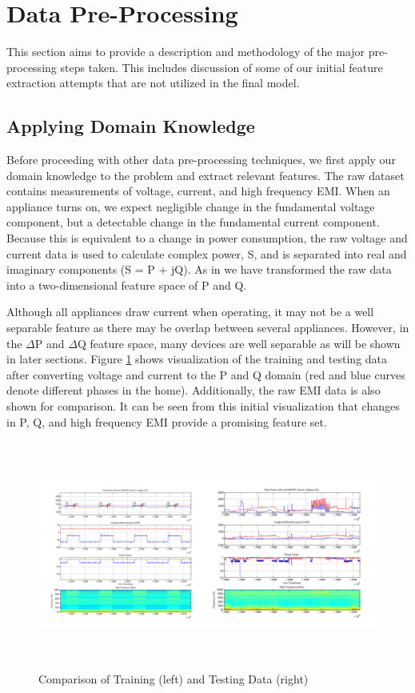\documentclass[11pt, letterpaper]{article}
\begin{document}
\section{Data Pre-Processing}\label{preprocess}

This section aims to provide a description and methodology of the major pre-processing steps taken.  This includes discussion of some of our initial feature extraction attempts that are not utilized in the final model.

\subsection{Applying Domain Knowledge}

Before proceeding with other data pre-processing techniques, we first apply our domain knowledge to the problem and extract relevant features.  The raw dataset contains measurements of voltage, current, and high frequency EMI.  When an appliance turns on, we expect negligible change in the fundamental voltage component, but a detectable change in the fundamental current component.  Because this is equivalent to a change in power consumption, the raw voltage and current data is used to calculate complex power, S, and is separated into real and imaginary components (S = P + jQ).  As in \cite{mit} we have transformed the raw data into a two-dimensional feature space of P and Q.

Although all appliances draw current when operating, it may not be a well separable feature as there may be overlap between several appliances. However, in the $\Delta$P and $\Delta$Q feature space, many devices are well separable as will be shown in later sections. Figure \ref{comparison} shows visualization of the training and testing data after converting voltage and current to the P and Q domain (red and blue curves denote different phases in the home).  Additionally, the raw EMI data is also shown for comparison.  It can be seen from this initial visualization that changes in P, Q, and high frequency EMI provide a promising feature set.


\begin{figure}[h]
\centering
\includegraphics[height=7.5cm]{fig/vis2.png}
\caption{Comparison of Training (left) and Testing Data (right)}\label{comparison}
\end{figure}
\end{document}
